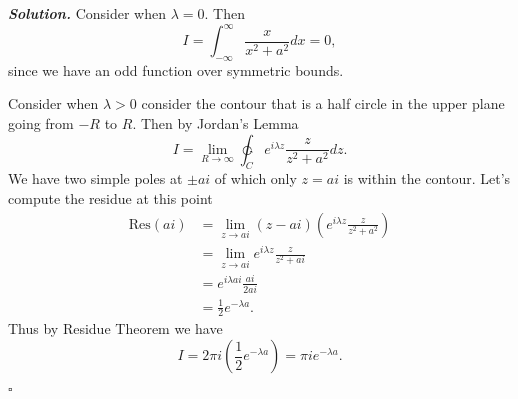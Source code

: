 \documentclass[12pt]{report}
\newenvironment{solution}[1][\it{Solution}]{\textbf{#1. } }{$\square$}
\newcommand{\paren}[1]{{\left(#1\right)}} %
\def\ointcc{{\ointctrclockwise}} %
\begin{document}
\begin{solution}
    \noindent
    Consider when $\lambda = 0.$ Then
    \[ 
        I = \int_{-\infty}^{\infty} \frac{x}{x^2 + a^2}dx = 0,
    \]
    since we have an odd function over symmetric bounds.

    \noindent
    Consider when $\lambda > 0$ consider the contour that is a half circle in the upper plane going from $-R$ to $R$. Then by Jordan's Lemma
    \[ I = \lim_{R \to \infty} \ointcc_C e^{i\lambda z} \frac{z}{z^2 + a^2}dz.\]
    We have two simple poles at $\pm ai$ of which only $z = ai$ is within the contour. Let's compute the residue at this point
    \begin{align*}
        \text{Res}(ai) &= \lim_{z \to ai}(z - ai)\paren{e^{i\lambda z}\frac{z}{z^2 + a^2}}\\
        &= \lim_{z \to ai} e^{i\lambda z}\frac{z}{z^2 + ai}\\
        &= e^{i\lambda ai}\frac{ai}{2ai}\\
        &= \frac{1}{2}e^{-\lambda a}.
    \end{align*} 
    Thus by Residue Theorem we have
    \[ 
        I = 2\pi i \paren{ \frac{1}{2}e^{-\lambda a}} = \pi i e^{-\lambda a}.
    \]


\end{solution}
\end{document}
